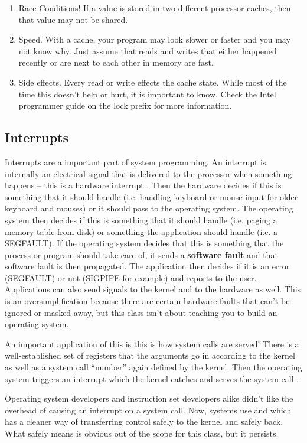 \begin{enumerate}
\item Race Conditions! If a value is stored in two different processor caches, then that value may not be shared.
\item Speed. With a cache, your program may look slower or faster and you may not know why. Just assume that reads and writes that either happened recently or are next to each other in memory are fast.
\item Side effects. Every read or write effects the cache state. While most of the time this doesn't help or hurt, it is important to know. Check the Intel programmer guide on the lock prefix for more information.
\end{enumerate}

\subsection{Interrupts}

Interrupts are a important part of system programming.
An interrupt is internally an electrical signal that is delivered to the processor when something happens -- this is a hardware interrupt \cite{redhat_hardware_int}.
Then the hardware decides if this is something that it should handle (i.e. handling keyboard or mouse input for older keyboard and mouses) or it should pass to the operating system.
The operating system then decides if this is something that it should handle (i.e. paging a memory table from disk) or something the application should handle (i.e. a SEGFAULT).
If the operating system decides that this is something that the process or program should take care of, it sends a \textbf{software fault} and that software fault is then propagated.
The application then decides if it is an error (SEGFAULT) or not (SIGPIPE for example) and reports to the user.
Applications can also send signals to the kernel and to the hardware as well.
This is an oversimplification because there are certain hardware faults that can't be ignored or masked away, but this class isn't about teaching you to build an operating system.

An important application of this is this is how system calls are served!
There is a well-established set of registers that the arguments go in according to the kernel as well as a system call ``number'' again defined by the kernel.
Then the operating system triggers an interrupt which the kernel catches and serves the system call \cite{garg_2006}.

Operating system developers and instruction set developers alike didn't like the overhead of causing an interrupt on a system call. Now, systems use  and  which has a cleaner way of transferring control safely to the kernel and safely back.
What safely means is obvious out of the scope for this class, but it persists.
